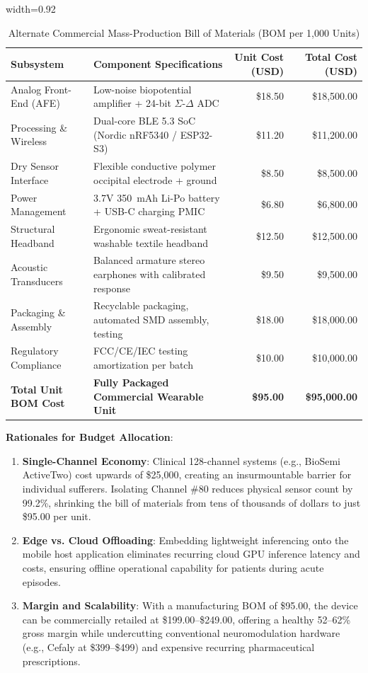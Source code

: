 \documentclass[12pt, a4paper]{report}
\begin{document}
\begin{table}[htbp]
\centering
\caption{Alternate Commercial Mass-Production Bill of Materials (BOM per 1,000 Units)}
\label{tab:alternate_budget}
\begin{adjustbox}{width=0.92\textwidth}
\begin{tabular}{llrr}
\toprule
\textbf{Subsystem} & \textbf{Component Specifications} & \textbf{Unit Cost (USD)} & \textbf{Total Cost (USD)} \\
\midrule
Analog Front-End (AFE) & Low-noise biopotential amplifier + 24-bit $\Sigma$-$\Delta$ ADC & \$18.50 & \$18,500.00 \\
Processing \& Wireless & Dual-core BLE 5.3 SoC (Nordic nRF5340 / ESP32-S3) & \$11.20 & \$11,200.00 \\
Dry Sensor Interface & Flexible conductive polymer occipital electrode + ground & \$8.50 & \$8,500.00 \\
Power Management & 3.7V 350~mAh Li-Po battery + USB-C charging PMIC & \$6.80 & \$6,800.00 \\
Structural Headband & Ergonomic sweat-resistant washable textile headband & \$12.50 & \$12,500.00 \\
Acoustic Transducers & Balanced armature stereo earphones with calibrated response & \$9.50 & \$9,500.00 \\
Packaging \& Assembly & Recyclable packaging, automated SMD assembly, testing & \$18.00 & \$18,000.00 \\
Regulatory Compliance & FCC/CE/IEC testing amortization per batch & \$10.00 & \$10,000.00 \\
\midrule
\textbf{Total Unit BOM Cost} & \textbf{Fully Packaged Commercial Wearable Unit} & \textbf{\$95.00} & \textbf{\$95,000.00} \\
\bottomrule
\end{tabular}
\end{adjustbox}
\end{table}

\noindent\textbf{Rationales for Budget Allocation}:
\begin{enumerate}
    \item \textbf{Single-Channel Economy}: Clinical 128-channel systems (e.g., BioSemi ActiveTwo) cost upwards of \$25,000, creating an insurmountable barrier for individual sufferers. Isolating Channel \#80 reduces physical sensor count by 99.2\%, shrinking the bill of materials from tens of thousands of dollars to just \$95.00 per unit.
    \item \textbf{Edge vs. Cloud Offloading}: Embedding lightweight inferencing onto the mobile host application eliminates recurring cloud GPU inference latency and costs, ensuring offline operational capability for patients during acute episodes.
    \item \textbf{Margin and Scalability}: With a manufacturing BOM of \$95.00, the device can be commercially retailed at \$199.00--\$249.00, offering a healthy 52--62\% gross margin while undercutting conventional neuromodulation hardware (e.g., Cefaly at \$399--\$499) and expensive recurring pharmaceutical prescriptions.
\end{enumerate}
\end{document}

